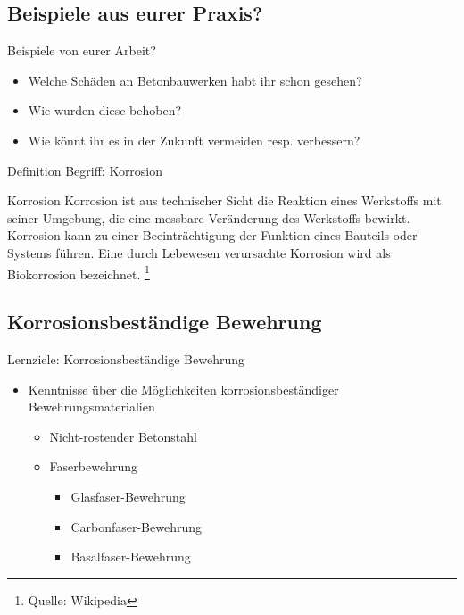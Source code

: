 \subsection{Beispiele aus eurer Praxis?}
\begin{frame}{Beispiele von eurer Arbeit?}
	\begin{block}{}
		\begin{itemize}
			\item[\textbullet] Welche Schäden an Betonbauwerken habt ihr schon gesehen?
			\item[\textbullet] Wie wurden diese behoben?
			\item[\textbullet] Wie könnt ihr es in der Zukunft vermeiden resp. verbessern?
		\end{itemize}
	\end{block}
\end{frame}

\begin{frame}{Definition Begriff: Korrosion}
	\begin{Definition_BS}{Korrosion}
		Korrosion ist aus technischer Sicht die Reaktion eines Werkstoffs mit seiner Umgebung, die
		eine messbare Veränderung des Werkstoffs bewirkt. Korrosion kann zu einer Beeinträchtigung
		der Funktion eines Bauteils oder Systems führen. Eine durch Lebewesen verursachte Korrosion
		wird als Biokorrosion bezeichnet. \footnote{Quelle: Wikipedia}
	\end{Definition_BS}
\end{frame}

\subsection{Korrosionsbeständige Bewehrung}

\begin{frame}{Lernziele: Korrosionsbeständige Bewehrung}
	\begin{myLernziele}
		\begin{itemize}
			\item[\textbullet] Kenntnisse über die Möglichkeiten korrosionsbeständiger Bewehrungsmaterialien
			      \begin{itemize}
			      	\item Nicht-rostender Betonstahl
			      	\item Faserbewehrung
			      	      \begin{itemize}
			      	      	\item Glasfaser-Bewehrung
			      	      	\item Carbonfaser-Bewehrung
			      	      	\item Basalfaser-Bewehrung
			      	      \end{itemize}
			      \end{itemize}
		\end{itemize}
	\end{myLernziele}
\end{frame}

